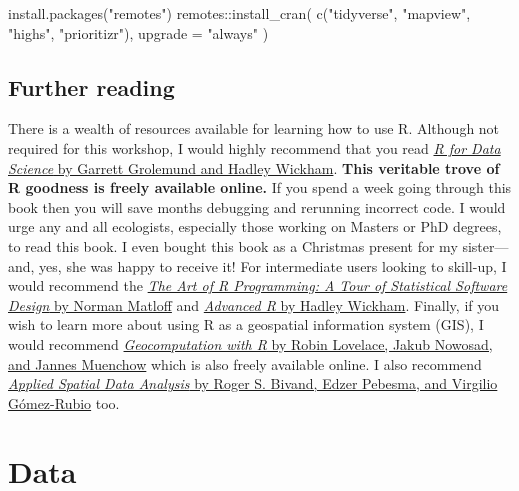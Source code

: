 \documentclass[
  12pt,
]{book}
\newenvironment{Shaded}{\begin{snugshade}}{\end{snugshade}}
\newcommand{\AttributeTok}[1]{\textcolor[rgb]{0.77,0.63,0.00}{#1}}
\newcommand{\FunctionTok}[1]{\textcolor[rgb]{0.00,0.00,0.00}{#1}}
\newcommand{\NormalTok}[1]{#1}
\newcommand{\SpecialCharTok}[1]{\textcolor[rgb]{0.00,0.00,0.00}{#1}}
\newcommand{\StringTok}[1]{\textcolor[rgb]{0.31,0.60,0.02}{#1}}
\begin{document}
\begin{Shaded}
\begin{Highlighting}[]
\FunctionTok{install.packages}\NormalTok{(}\StringTok{"remotes"}\NormalTok{)}
\NormalTok{remotes}\SpecialCharTok{::}\FunctionTok{install\_cran}\NormalTok{(}
  \FunctionTok{c}\NormalTok{(}\StringTok{"tidyverse"}\NormalTok{, }\StringTok{"mapview"}\NormalTok{, }\StringTok{"highs"}\NormalTok{, }\StringTok{"prioritizr"}\NormalTok{),}
  \AttributeTok{upgrade =} \StringTok{"always"}
\NormalTok{)}
\end{Highlighting}
\end{Shaded}

\hypertarget{further-reading}{%
\section{Further reading}\label{further-reading}}

There is a wealth of resources available for learning how to use R. Although not required for this workshop, I would highly recommend that you read \href{https://r4ds.had.co.nz/}{\emph{R for Data Science} by Garrett Grolemund and Hadley Wickham}. \textbf{This veritable trove of R goodness is freely available online.} If you spend a week going through this book then you will save months debugging and rerunning incorrect code. I would urge any and all ecologists, especially those working on Masters or PhD degrees, to read this book. I even bought this book as a Christmas present for my sister---and, yes, she was happy to receive it! For intermediate users looking to skill-up, I would recommend the \href{http://shop.oreilly.com/product/9781593273842.do}{\emph{The Art of R Programming: A Tour of Statistical Software Design} by Norman Matloff} and \href{https://adv-r.hadley.nz/}{\emph{Advanced R} by Hadley Wickham}. Finally, if you wish to learn more about using R as a geospatial information system (GIS), I would recommend \href{https://geocompr.robinlovelace.net/}{\emph{Geocomputation with R} by Robin Lovelace, Jakub Nowosad, and Jannes Muenchow} which is also freely available online. I also recommend \href{https://www.springer.com/gp/book/9781461476177}{\emph{Applied Spatial Data Analysis} by Roger S. Bivand, Edzer Pebesma, and Virgilio Gómez-Rubio} too.

\hypertarget{data}{%
\chapter{Data}\label{data}}
\end{document}
